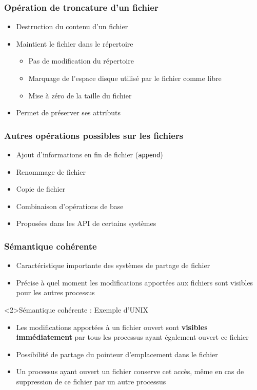 \begin{frame}
\frametitle{Opération de troncature d'un fichier}
\begin{itemize}
\item Destruction du contenu d'un fichier
\item Maintient le fichier dans le répertoire
\begin{itemize}
\item Pas de modification du répertoire
\item Marquage de l'espace disque utilisé par le fichier comme libre
\item Mise à zéro de la taille du fichier
\end{itemize}
\item Permet de préserver ses attributs
\end{itemize}
\end{frame}


\begin{frame}
\frametitle{Autres opérations possibles sur les fichiers}
\begin{itemize}
\item Ajout d'informations en fin de fichier (\texttt{append})
\item Renommage de fichier
\item Copie de fichier
\end{itemize}
\begin{itemize}
\item Combinaison d'opérations de base
\item Proposées dans les API de certains systèmes
\end{itemize}
\end{frame}



\begin{frame}
\frametitle{Sémantique cohérente}
\begin{itemize}
\item Caractéristique importante des systèmes de partage de fichier
\item Précise à quel moment les modifications apportées aux fichiers sont visibles pour les autres processus
\end{itemize}
\begin{exampleblock}<2>{Sémantique cohérente : Exemple d'UNIX}
\begin{itemize}
\item Les modifications apportées à un fichier ouvert sont \textbf{visibles immédiatement} par tous les processus ayant également ouvert ce fichier
\item Possibilité de partage du pointeur d'emplacement dans le fichier
\item Un processus ayant ouvert un fichier conserve cet accès, même en cas de suppression de ce fichier par un autre processus
\end{itemize}
\end{exampleblock}
\end{frame}


